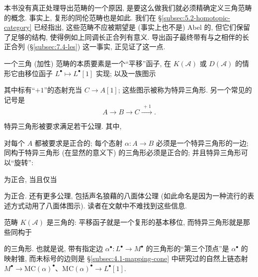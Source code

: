 本书没有真正处理导出范畴的一个原因, 是要这么做我们就必须精确定义三角范畴的概念. 事实上, 复形的同伦范畴也是如此. 我们在 \S\ref{subsec:5.2-homotopic-category} 已经指出, 这些范畴不应被期望是 (事实上也不是) Abel 的, 但它们保留了足够的结构, 使得例如上同调长正合列有意义. 导出函子最终带有与之相伴的长正合列 (\S\ref{subsec:7.4-les}) 这一事实, 正见证了这一点.

一个三角 (加性) 范畴的本质要素是一个“平移”函子, 在 $K(\mathcal{A})$ 或 $D(\mathcal{A})$ 的情形它由移位函子 $L^\bullet \mapsto L^\bullet[1]$ 实现; 以及一族图示
\begin{center}
\end{center}
其中标有“$+1$”的态射充当 $C\to A[1]$; 这些图示被称为特异三角形. 另一个常见的记号是
\[
A \xrightarrow{\quad} B \xrightarrow{\quad} C \xrightarrow{\ +1\ } .
\]

特异三角形被要求满足若干公理. 其中,
\begin{center}
\end{center}
对每个 $A$ 都被要求是正合的; 每个态射 $\alpha:A\to B$ 必须是一个特异三角形的一边; 同构于特异三角形 (在显然的意义下) 的三角形必须是正合的; 并且特异三角形可以“旋转”:
\begin{center}
\end{center}
为正合, 当且仅当
\begin{center}
\end{center}
为正合. 还有更多公理, 包括声名狼藉的八面体公理 (如此命名是因为一种流行的表述方式动用了八面体图示). 读者在文献中不难找到这些信息.

范畴 $K(\mathcal{A})$ 是三角的: 平移函子就是一个复形的基本移位, 而特异三角形就是那些同构于
\begin{center}
\end{center}
的三角形. 也就是说, 带有指定边 $\alpha^\bullet:L^\bullet\to M^\bullet$ 的三角形的“第三个顶点”是 $\alpha^\bullet$ 的映射锥, 而未标号的边则是 \S\ref{subsec:4.1-mapping-cone} 中研究过的自然上链态射 $M^\bullet\to \mathrm{MC}(\alpha)^\bullet$、$\mathrm{MC}(\alpha)^\bullet\to L^\bullet[1]$.

